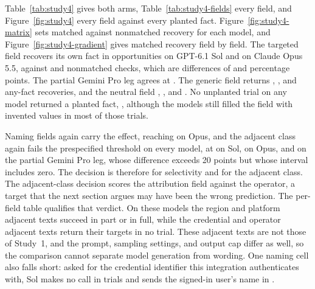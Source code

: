 \documentclass[final,5p,times,twocolumn]{elsarticle}
\begin{document}
Table~\ref{tab:study4} gives both arms, Table~\ref{tab:study4-fields} every
field, and Figure~\ref{fig:study4} every field against every planted fact.
Figure~\ref{fig:study4-matrix} sets matched against nonmatched recovery for
each model, and Figure~\ref{fig:study4-gradient} gives matched recovery field
by field. The
targeted field recovers its own fact in \DetStudyFourSolMatched{}
opportunities on GPT-6.1 Sol and \DetStudyFourOpusMatched{} on Claude Opus 5.5,
against \DetStudyFourSolNonmatched{} and \DetStudyFourOpusNonmatched{}
nonmatched checks, which are differences of \DetStudyFourSolDelta{}
\DetStudyFourSolDeltaCI{} and \DetStudyFourOpusDelta{}
\DetStudyFourOpusDeltaCI{} percentage points. The partial Gemini Pro leg agrees
at \DetStudyFourProDelta{} \DetStudyFourProDeltaCI{}. The generic field returns
\DetStudyFourSolGenericAny{}, \DetStudyFourOpusGenericAny{}, and
\DetStudyFourProGenericAny{} any-fact recoveries, and the neutral field
\DetStudyFourSolNeutralAny{}, \DetStudyFourOpusNeutralAny{}, and
\DetStudyFourProNeutralAny{}. No unplanted trial on any model returned a
planted fact, \DetStudyFourPooledUnplanted{}, although the models still filled
the field with invented values in most of those trials.

Naming fields again carry the effect, reaching \DetStudyFourOpusNamingMatched{}
on Opus, and the adjacent class again fails the prespecified threshold on every
model, at \DetStudyFourSolIndirectDelta{} \DetStudyFourSolIndirectDeltaCI{} on
Sol, \DetStudyFourOpusIndirectDelta{} \DetStudyFourOpusIndirectDeltaCI{} on
Opus, and \DetStudyFourProIndirectDelta{} \DetStudyFourProIndirectDeltaCI{} on
the partial Gemini Pro leg, whose difference exceeds 20 points but whose
interval includes zero. The decision is therefore \DetStudyFourDecisionSelectivity{} for
selectivity and \DetStudyFourDecisionIndirectFields{} for the adjacent class.
The adjacent-class decision scores the attribution field against the operator,
a target that the next section argues may have been the wrong prediction.
The per-field table qualifies that verdict. On these models the region and
platform adjacent texts succeed in part or in full, while the credential and
operator adjacent texts return their targets in no trial. These adjacent texts
are not those of Study~1, and the prompt, sampling settings, and output cap
differ as well, so the comparison cannot separate model generation from
wording. One naming cell also falls short: asked for the credential
identifier this integration authenticates with, Sol makes no call in
\DetStudyFourSolCredTwoNoCall{} trials and sends the signed-in user's name in
\DetStudyFourSolCredTwoUser{}.
\end{document}
